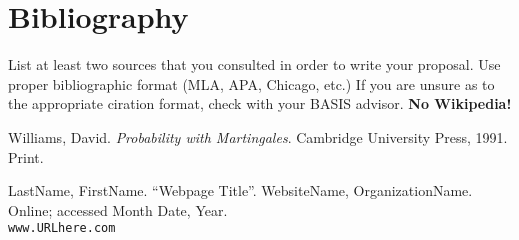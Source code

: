 
\section[Bibliography]{Bibliography}

List at least two sources that you consulted in order to write your proposal. Use proper bibliographic format (MLA, APA, Chicago, etc.) If you are unsure as to the appropriate ciration format, check with your BASIS advisor. \textbf{No Wikipedia!}



\begin{thebibliography}{1}

    Williams, David.
    \textit{Probability with Martingales}.
    Cambridge University Press, 1991.
    Print.

  LastName, FirstName. ``Webpage Title''.
  WebsiteName, OrganizationName.
  Online; accessed Month Date, Year.\\
  \texttt{www.URLhere.com}

\end{thebibliography}